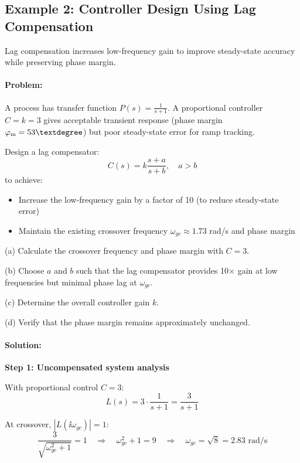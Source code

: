 \documentclass[11pt,a4paper]{article}
\begin{document}
\subsection{Example 2: Controller Design Using Lag Compensation}

Lag compensation increases low-frequency gain to improve steady-state accuracy while preserving phase margin.

\paragraph{Problem:}
A process has transfer function $P(s) = \frac{1}{s+1}$. A proportional controller $C = k = 3$ gives acceptable transient response (phase margin $\phasemargin = 53°$) but poor steady-state error for ramp tracking.

Design a lag compensator:
\begin{equation}
  C(s) = k\frac{s + a}{s + b}, \quad a > b
\end{equation}
to achieve:
\begin{itemize}
  \item Increase the low-frequency gain by a factor of 10 (to reduce steady-state error)
  \item Maintain the existing crossover frequency $\omega_{gc} \approx 1.73$ rad/s and phase margin
\end{itemize}

(a) Calculate the crossover frequency and phase margin with $C = 3$.

(b) Choose $a$ and $b$ such that the lag compensator provides 10× gain at low frequencies but minimal phase lag at $\omega_{gc}$.

(c) Determine the overall controller gain $k$.

(d) Verify that the phase margin remains approximately unchanged.

\paragraph{Solution:}

\textbf{Step 1: Uncompensated system analysis}

With proportional control $C = 3$:
\begin{equation}
  L(s) = 3 \cdot \frac{1}{s+1} = \frac{3}{s+1}
\end{equation}

At crossover, $|L(\ii\omega_{gc})| = 1$:
\begin{equation}
  \frac{3}{\sqrt{\omega_{gc}^2 + 1}} = 1 \quad \Rightarrow \quad \omega_{gc}^2 + 1 = 9 \quad \Rightarrow \quad \omega_{gc} = \sqrt{8} = 2.83 \text{ rad/s}
\end{equation}
\end{document}
